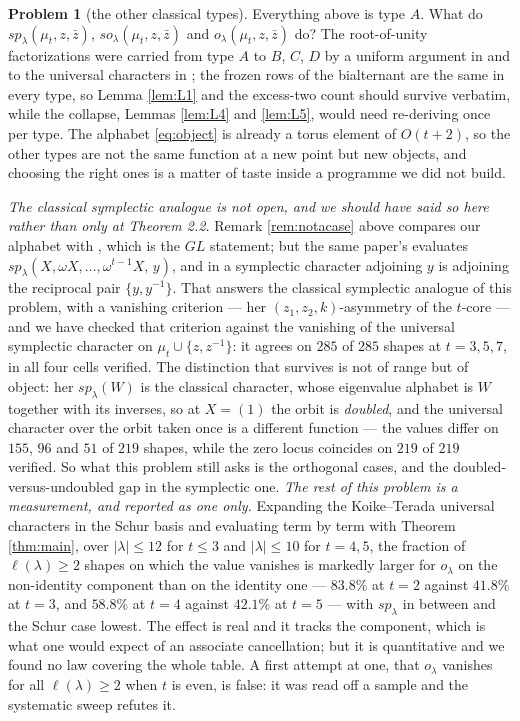 \documentclass[11pt,reqno]{amsart}
\newcommand{\stverif}{\textcolor{hverif}{\small verified}}
\theoremstyle{plain}
\theoremstyle{definition}
\newtheorem{problem}[theorem]{Problem}
\newcommand{\zt}{\mu_t}
\newcommand{\zb}{\bar z}
\begin{document}
\begin{problem}[the other classical types]\label{prob:types}
Everything above is type $A$. What do $sp_\lambda(\zt,z,\zb)$, $so_\lambda(\zt,z,\zb)$ and
$o_\lambda(\zt,z,\zb)$ do? The root-of-unity factorizations were carried from type $A$ to $B$, $C$,
$D$ by a uniform argument in \cite{AK22} and to the universal characters in \cite{Alb23}; the frozen
rows of the bialternant are the same in every type, so Lemma \ref{lem:L1} and the excess-two count
should survive verbatim, while the collapse, Lemmas \ref{lem:L4} and \ref{lem:L5}, would need
re-deriving once per type. The alphabet \eqref{eq:object} is already a torus element of $O(t+2)$, so
the other types are not the same function at a new point but new objects, and choosing the right ones
is a matter of taste inside a programme we did not build.

\emph{The classical symplectic analogue is not open, and we should have said so here rather than
only at Theorem 2.2.} Remark \ref{rem:notacase} above compares our alphabet with \cite[Theorem 2.2]{Kum24}, which is
the $GL$ statement; but the same paper's \cite[Theorem 2.8]{Kum24} evaluates
$sp_\lambda(X,\omega X,\dots,\omega^{t-1}X,\,y)$, and in a symplectic character adjoining $y$ is
adjoining the reciprocal pair $\{y,y^{-1}\}$. That answers the classical symplectic analogue of this problem,
with a vanishing criterion --- her $(z_1,z_2,k)$-asymmetry of the $t$-core --- and we have checked
that criterion against the vanishing of the universal symplectic character on
$\mu_t\cup\{z,z^{-1}\}$: it agrees on $285$ of $285$ shapes at $t=3,5,7$, in all four cells
\stverif. The distinction that survives is not of range but of object: her $sp_\lambda(W)$ is the
classical character, whose eigenvalue alphabet is $W$ together with its inverses, so at $X=(1)$ the
orbit is \emph{doubled}, and the universal character over the orbit taken once is a different
function --- the values differ on $155$, $96$ and $51$ of $219$ shapes, while the zero locus
coincides on $219$ of $219$ \stverif. So what this problem still asks is the orthogonal cases, and
the doubled-versus-undoubled gap in the symplectic one. \emph{The rest of this problem is a
measurement, and reported as one only.} Expanding the Koike--Terada universal characters in the Schur basis and evaluating
term by term with Theorem \ref{thm:main}, over $|\lambda|\le12$ for $t\le3$ and $|\lambda|\le10$ for $t=4,5$, the fraction of
$\ell(\lambda)\ge2$ shapes on which the value vanishes is markedly larger for $o_\lambda$ on the
non-identity component than on the identity one --- $83.8\%$ at $t=2$ against $41.8\%$ at $t=3$, and
$58.8\%$ at $t=4$ against $42.1\%$ at $t=5$ --- with $sp_\lambda$ in between and the Schur case
lowest. The effect is real and it tracks the component, which is what one would expect of an
associate cancellation; but it is quantitative and we found no law covering the whole table. A first
attempt at one, that
$o_\lambda$ vanishes for all $\ell(\lambda)\ge2$ when $t$ is even, is false: it was read off a
sample and the systematic sweep refutes it.


\end{problem}
\end{document}
